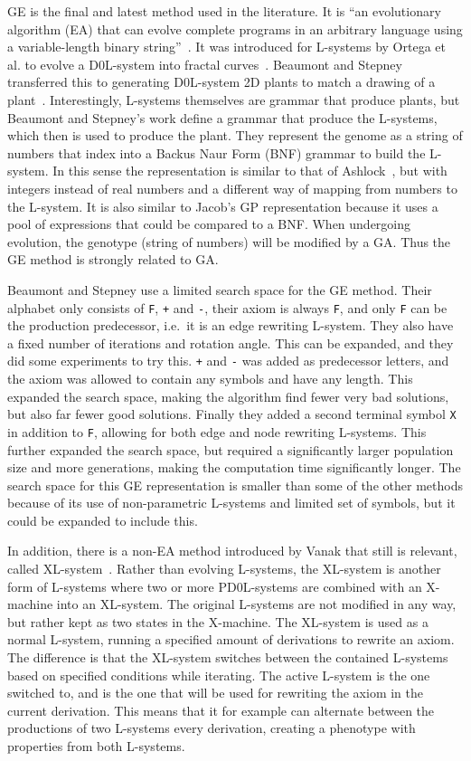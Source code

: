 GE is the final and latest method used in the literature.
It is ``an evolutionary algorithm (EA) that can evolve complete programs in an arbitrary language using a variable-length binary string''~\cite{2003Oneil}.
It was introduced for L-systems by Ortega et al. to evolve a D0L-system into fractal curves~\cite{2003Ortega}.
Beaumont and Stepney transferred this to generating D0L-system 2D plants to match a drawing of a plant~\cite{2009Beaumont}.
Interestingly, L-systems themselves are grammar that produce plants, but Beaumont and Stepney's work define a grammar that produce the L-systems, which then is used to produce the plant.
They represent the genome as a string of numbers that index into a Backus Naur Form (BNF) grammar to build the L-system.
In this sense the representation is similar to that of Ashlock~\cite{2006Ashlock}, but with integers instead of real numbers and a different way of mapping from numbers to the L-system.
It is also similar to Jacob's GP representation because it uses a pool of expressions that could be compared to a BNF.
When undergoing evolution, the genotype (string of numbers) will be modified by a GA.
Thus the GE method is strongly related to GA.

Beaumont and Stepney use a limited search space for the GE method.
Their alphabet only consists of \texttt{F}, \texttt{+} and \texttt{-}, their axiom is always \texttt{F}, and only \texttt{F} can be the production predecessor, i.e.\ it is an edge rewriting L-system.
They also have a fixed number of iterations and rotation angle.
This can be expanded, and they did some experiments to try this.
\texttt{+} and \texttt{-} was added as predecessor letters, and the axiom was allowed to contain any symbols and have any length.
This expanded the search space, making the algorithm find fewer very bad solutions, but also far fewer good solutions.
Finally they added a second terminal symbol \texttt{X} in addition to \texttt{F}, allowing for both edge and node rewriting L-systems.
This further expanded the search space, but required a significantly larger population size and more generations, making the computation time significantly longer.
The search space for this GE representation is smaller than some of the other methods because of its use of non-parametric L-systems and limited set of symbols, but it could be expanded to include this.

In addition, there is a non-EA method introduced by Vanak that still is relevant, called XL-system~\cite{2000Vanak}.
Rather than evolving L-systems, the XL-system is another form of L-systems where two or more PD0L-systems are combined with an X-machine into an XL-system.
The original L-systems are not modified in any way, but rather kept as two states in the X-machine.
The XL-system is used as a normal L-system, running a specified amount of derivations to rewrite an axiom.
The difference is that the XL-system switches between the contained L-systems based on specified conditions while iterating.
The active L-system is the one switched to, and is the one that will be used for rewriting the axiom in the current derivation.
This means that it for example can alternate between the productions of two L-systems every derivation, creating a phenotype with properties from both L-systems.

